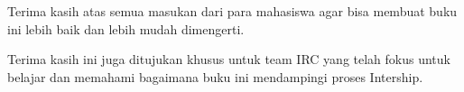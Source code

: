 Terima kasih atas semua masukan dari para mahasiswa agar bisa membuat buku ini 
lebih baik dan lebih mudah dimengerti.

Terima kasih ini juga ditujukan khusus untuk team IRC yang 
telah fokus untuk belajar dan memahami bagaimana buku ini mendampingi proses 
Intership.
